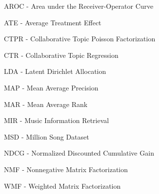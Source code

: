 AROC - Area under the Receiver-Operator Curve

ATE - Average Treatment Effect

CTPR - Collaborative Topic Poisson Factorization

CTR - Collaborative Topic Regression

LDA - Latent Dirichlet Allocation

MAP - Mean Average Precision

MAR - Mean Average Rank

MIR - Music Information Retrieval

MSD - Million Song Dataset

NDCG - Normalized Discounted Cumulative Gain

NMF - Nonnegative Matrix Factorization

WMF - Weighted Matrix Factorization